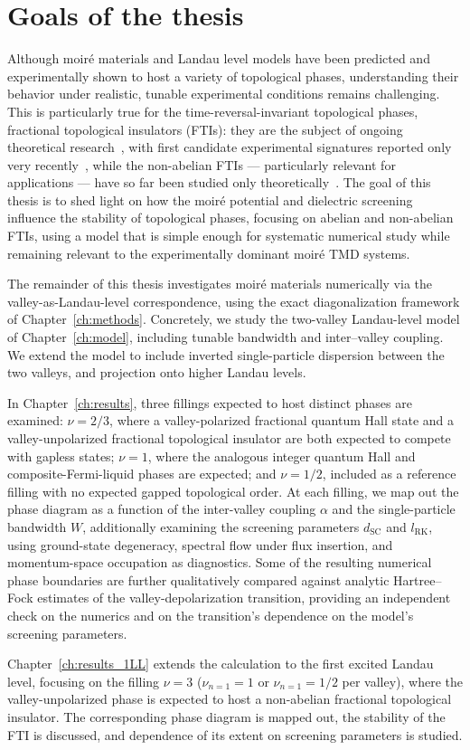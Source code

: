\section{Goals of the thesis}

Although moir\'e materials and Landau level models have been predicted and experimentally shown to host a variety of topological phases, understanding their behavior under realistic, tunable experimental conditions remains challenging. This is particularly true for the time-reversal-invariant topological phases, fractional topological insulators (FTIs): they are the subject of ongoing theoretical research~\cite{kwan2025textured}, with first candidate experimental signatures reported only very recently~\cite{bvrb-z4hj}, while the non-abelian FTIs --- particularly relevant for applications --- have so far been studied only theoretically~\cite{abouelkomsan2025non}. The goal of this thesis is to shed light on how the moir\'e potential and dielectric screening influence the stability of topological phases, focusing on abelian and non-abelian FTIs, using a model that is simple enough for systematic numerical study while remaining relevant to the experimentally dominant moir\'e TMD systems.

The remainder of this thesis investigates moir\'e materials numerically via the valley-as-Landau-level correspondence, using the exact diagonalization framework of Chapter~\ref{ch:methods}. Concretely, we study the two-valley Landau-level model of Chapter~\ref{ch:model}, including tunable bandwidth and inter--valley coupling. We extend the model to include inverted single-particle dispersion between the two valleys, and projection onto higher Landau levels.

In Chapter~\ref{ch:results}, three fillings expected to host distinct phases are examined: $\nu = 2/3$, where a valley-polarized fractional quantum Hall state and a valley-unpolarized fractional topological insulator are both expected to compete with gapless states; $\nu = 1$, where the analogous integer quantum Hall and composite-Fermi-liquid phases are expected; and $\nu = 1/2$, included as a reference filling with no expected gapped topological order. At each filling, we map out the phase diagram as a function of the inter-valley coupling $\alpha$ and the single-particle bandwidth $W$, additionally examining the screening parameters $d_{\mathrm{SC}}$ and $l_{\mathrm{RK}}$, using ground-state degeneracy, spectral flow under flux insertion, and momentum-space occupation as diagnostics. Some of the resulting numerical phase boundaries are further qualitatively compared against analytic Hartree--Fock estimates of the valley-depolarization transition, providing an independent check on the numerics and on the transition's dependence on the model's screening parameters. %

Chapter~\ref{ch:results_1LL} extends the calculation to the first excited Landau level, focusing on the filling $\nu=3$ ($\nu_{n=1} = 1$ or $\nu_{n=1} = 1/2$ per valley), where the valley-unpolarized phase is expected to host a non-abelian fractional topological insulator. The corresponding phase diagram is mapped out, the stability of the FTI is discussed, and dependence of its extent on screening parameters is studied.
